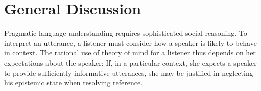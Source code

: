 \documentclass[manuscript]{stjour}
\begin{document}
%

\section{General Discussion}

Pragmatic language understanding requires sophisticated social reasoning. To interpret an utterance, a listener must consider how a speaker is likely to behave in context.
The rational use of theory of mind for a listener thus depends on her expectations about the speaker: If, in a particular context, she expects a speaker to provide sufficiently informative utterances, she may be justified in neglecting his epistemic state when resolving reference.
\end{document}
